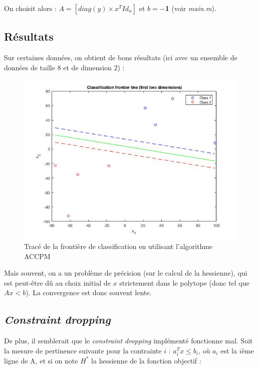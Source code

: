 \documentclass{article}
\begin{document}
On choisit alors : $A = [ diag(y) \times x^T Id_n ]$ et $b = -$\textbf{1} (voir \emph{main.m}).

\subsection{Résultats}

Sur certaines données, on obtient de bons résultats (ici avec un ensemble de données de taille $8$ et de dimension $2$) :\\

         \begin{figure}[H]
           \begin{center}
             \includegraphics[scale=0.5]{images/accpmtestfig.jpg}
             \caption{Tracé de la frontière de classification en utilisant l'algorithme ACCPM}
           \end{center}
         \end{figure}

Mais souvent, on a un problème de précision (sur le calcul de la hessienne), qui est peut-être dû au choix initial de $x$ strictement dans le polytope (donc tel que $Ax < b$). La convergence est donc souvent lente.\\

\subsection{\emph{Constraint dropping}}

De plus, il semblerait que le \emph{constraint dropping} implémenté fonctionne mal. Soit la mesure de pertinence suivante pour la contrainte $i$ : $a_i^Tx \leq b_i$, où $a_i$ est la $i$ème ligne de A, et si on note $H^*$ la hessienne de la fonction objectif :\\
\end{document}
